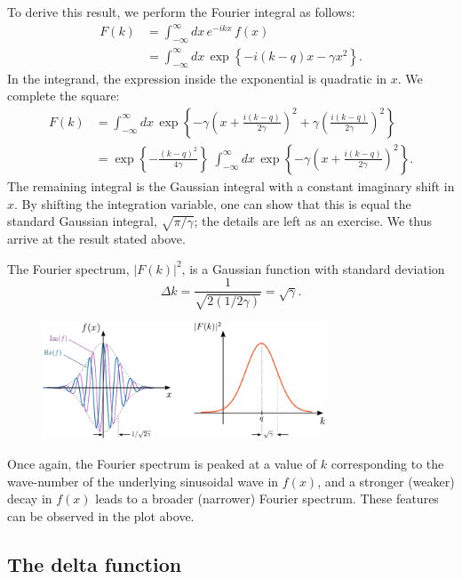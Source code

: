 \documentclass[10pt,a4paper]{article}
\begin{document}
To derive this result, we perform the Fourier integral as follows:
\begin{align}
  F(k) &= \int_{-\infty}^\infty dx \, e^{-ikx}\, f(x) \\
  &= \int_{-\infty}^\infty dx \, \exp\left\{-i(k-q)x -\gamma x^2\right\}.
\end{align}
In the integrand, the expression inside the exponential is quadratic in
$x$. We complete the square:
\begin{align}
  F(k) &= \int_{-\infty}^\infty dx \,
  \exp\left\{-\gamma\left(x + \frac{i(k-q)}{2\gamma}\right)^2 + \gamma\left(\frac{i(k-q)}{2\gamma}\right)^2\right\} \\
  &= \exp\left\{ - \frac{(k-q)^2}{4\gamma}\right\}\; \int_{-\infty}^\infty dx \, \exp\left\{-\gamma\left(x + \frac{i(k-q)}{2\gamma}\right)^2\right\}.
\end{align}
The remaining integral is the Gaussian integral with a constant
imaginary shift in $x$. By shifting the integration variable, one can
show that this is equal the standard Gaussian integral,
$\sqrt{\pi/\gamma}$; the details are left as an exercise.  We thus
arrive at the result stated above.

The Fourier spectrum, $|F(k)|^2$, is a Gaussian function with standard
deviation
\begin{equation}
\Delta k = \frac{1}{\sqrt{2(1/2\gamma)}} = \sqrt{\gamma}.
\end{equation}

\begin{figure}[h]
  \centering\includegraphics[width=0.75\textwidth]{fourier_example4}
\end{figure}

\noindent
Once again, the Fourier spectrum is peaked at a value of $k$
corresponding to the wave-number of the underlying sinusoidal wave in
$f(x)$, and a stronger (weaker) decay in $f(x)$ leads to a broader
(narrower) Fourier spectrum. These features can be observed in the
plot above.

\subsection{The delta function}
\label{delta-function}
\end{document}
